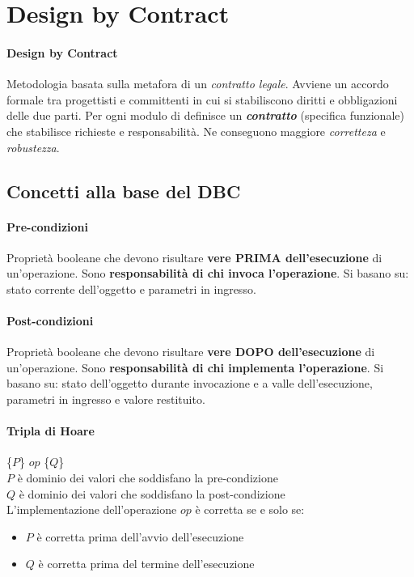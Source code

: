\section{Design by Contract}

\paragraph{Design by Contract} Metodologia basata sulla metafora di un \textit{contratto legale}. Avviene un accordo formale tra progettisti e committenti in cui si stabiliscono diritti e obbligazioni delle due parti. Per ogni modulo di definisce un \textbf{\textit{contratto}} (specifica funzionale) che stabilisce richieste e responsabilità. Ne conseguono maggiore \textit{corretteza} e \textit{robustezza}.

\subsection{Concetti alla base del DBC}

\paragraph{Pre-condizioni} Proprietà booleane che devono risultare \textbf{vere PRIMA dell'esecuzione} di un'operazione. Sono \textbf{responsabilità di chi invoca l'operazione}. Si basano su: stato corrente dell'oggetto e parametri in ingresso.

\paragraph{Post-condizioni} Proprietà booleane che devono risultare \textbf{vere DOPO dell'esecuzione} di un'operazione. Sono \textbf{responsabilità di chi implementa l'operazione}. Si basano su: stato dell'oggetto durante invocazione e a valle dell'esecuzione, parametri in ingresso e valore restituito.

\paragraph{Tripla di Hoare} \{$P$\} $op$ \{$Q$\}\\
$P$ è dominio dei valori che soddisfano la pre-condizione\\
$Q$ è dominio dei valori che soddisfano la post-condizione\\
L'implementazione dell'operazione $op$ è corretta se e solo se:
\begin{itemize}
    \item $P$ è corretta prima dell'avvio dell'esecuzione
    \item $Q$ è corretta prima del termine dell'esecuzione
\end{itemize}

